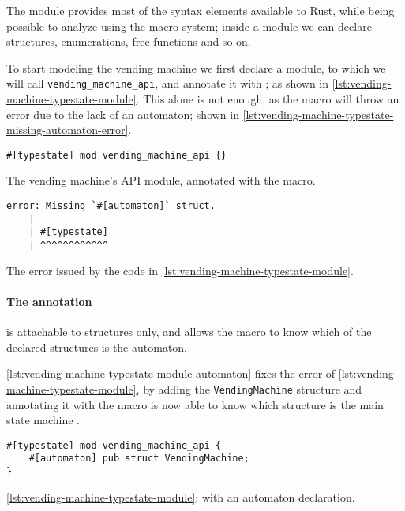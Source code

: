 The module provides most of the syntax elements available to  Rust,
while being possible to analyze using the macro system;
inside a module we can declare structures, enumerations, free functions and so on.

To start modeling the vending machine we first declare a module, to which we will call \texttt{vending\_machine\_api},
and annotate it with ; as shown in \autoref{lst:vending-machine-typestate-module}.
This alone is not enough, as the macro will throw an error due to the lack of an automaton; shown in \autoref{lst:vending-machine-typestate-missing-automaton-error}.

\begin{listing}
    \begin{verbatim}
#[typestate] mod vending_machine_api {}
    \end{verbatim}
    \caption{The vending machine's \gls{API} module, annotated with the  macro.}
    \label{lst:vending-machine-typestate-module}
\end{listing}

\begin{listing}
    \begin{verbatim}
error: Missing `#[automaton]` struct.
    |
    | #[typestate]
    | ^^^^^^^^^^^^
    \end{verbatim}
    \caption{The error issued by the code in \autoref{lst:vending-machine-typestate-module}.}
    \label{lst:vending-machine-typestate-missing-automaton-error}
\end{listing}

\paragraph{The  annotation} is attachable to structures only, %
and allows the macro to know which of the declared structures is the automaton.

\autoref{lst:vending-machine-typestate-module-automaton} fixes the error of \autoref{lst:vending-machine-typestate-module},
by adding the \texttt{VendingMachine} structure and annotating it with 
the macro is now able to know which structure is the main state machine .

\begin{listing}
    \begin{verbatim}
#[typestate] mod vending_machine_api {
    #[automaton] pub struct VendingMachine;
}
    \end{verbatim}
    \caption{\autoref{lst:vending-machine-typestate-module}; with an automaton declaration.}
    \label{lst:vending-machine-typestate-module-automaton}
\end{listing}

